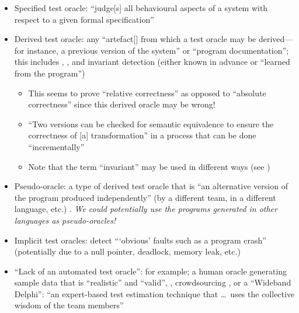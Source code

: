 \begin{itemize}
    \item Specified test oracle: ``judge[s] all behavioural aspects of a
          system with respect to a given formal specification''
          \citep[p.~510]{BarrEtAl2015}
    \item Derived test oracle: any ``artefact[] from which a
          test oracle may be derived---for instance, a previous version of
          the system'' or ``program documentation''; this includes
          ,
          \citep[p.~510]{BarrEtAl2015}, and invariant detection (either
          known in advance or ``learned from the program'')
          \citep[p.~516]{BarrEtAl2015}
          \begin{itemize}
              \item This seems to prove ``relative correctness'' as
                    opposed to ``absolute correctness''
                    \citep[p.~345]{LahiriEtAl2013} since this derived
                    oracle may be wrong!
              \item ``Two versions can be checked for semantic equivalence
                    to ensure the correctness of [a] transformation'' in a
                    process that can be done ``incrementally''
                    \citep[p.~345]{LahiriEtAl2013}
              \item Note that the term ``invariant'' may be used in
                    different ways (see \citep[p.~348]{ChalinEtAl2006})
          \end{itemize}
    \item Pseudo-oracle: a type of derived test oracle that is ``an
          alternative version of the program produced independently'' (by a
          different team, in a different language, etc.)
          \citep[p.~515]{BarrEtAl2015} .
          \emph{We could potentially use the
              programs generated in other languages as pseudo-oracles!}
    \item Implicit test oracles: detect ```obvious' faults such as a program
          crash'' (potentially due to a null pointer, deadlock, memory leak,
          etc.) \citep[p.~510]{BarrEtAl2015}
    \item ``Lack of an automated test oracle'': for example; a human oracle
          generating sample data that is ``realistic'' and ``valid'',
          \citep[pp.~510-511]{BarrEtAl2015}, crowdsourcing
          \citep[p.~520]{BarrEtAl2015}, or a ``Wideband Delphi'': ``an
          expert-based test estimation technique that \dots\ uses the
          collective wisdom of the team members'' \citepISTQB{}
\end{itemize}

